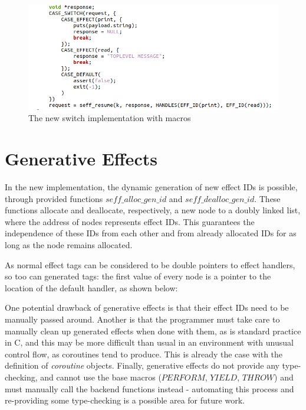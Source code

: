\documentclass[logo,bsc,singlespacing,parskip,online]{infthesis}
\begin{document}
\begin{figure}[ht]
    \centering
    \includegraphics[width=1\linewidth]{newswitch.png}
    \caption{The new switch implementation with macros}
    \label{fig:newswitch}
\end{figure}

\section{Generative Effects}

In the new implementation, the dynamic generation of new effect IDs is possible, through provided functions $seff\_alloc\_gen\_id$ and $seff\_dealloc\_gen\_id$. These functions allocate and deallocate, respectively, a new node to a doubly linked list, where the address of nodes represents effect IDs. This guarantees the independence of these IDs from each other and from already allocated IDs for as long as the node remains allocated.

As normal effect tags can be considered to be double pointers to effect handlers, so too can generated tags: the first value of every node is a pointer to the location of the default handler, as shown below:\todo

One potential drawback of generative effects is that their effect IDs need to be manually passed around. Another is that the programmer must take care to manually clean up generated effects when done with them, as is standard practice in C, and this may be more difficult than usual in an environment with unusual control flow, as coroutines tend to produce. This is already the case with the definition of \textit{coroutine} objects. Finally, generative effects do not provide any type-checking, and cannot use the base macros ($PERFORM$, $YIELD$, $THROW$) and must manually call the backend functions instead - automating this process and re-providing some type-checking is a possible area for future work.
\end{document}
